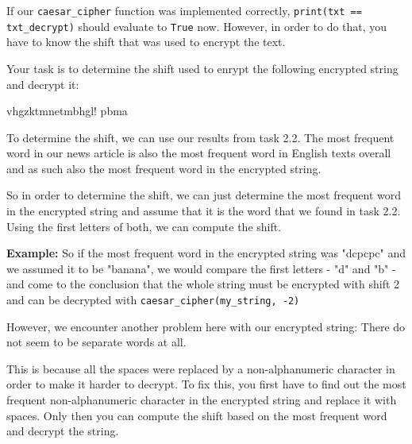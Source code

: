 \vspace{1em}

\noindent If our \texttt{caesar\_cipher} function was implemented correctly, \texttt{print(txt == txt\_decrypt)} should evaluate to \texttt{True} now. However, in order to do that, you have to know the shift that was used to encrypt the text. 

\vspace{1em}

\noindent Your task is to determine the shift used to enrypt the following encrypted string and decrypt it:

\begin{outputcode}

vhgzktmnetmbhgl!%
pbma%

\end{outputcode}

\noindent To determine the shift, we can use our results from task 2.2. The most frequent word in our news article is also the most frequent word in English texts overall and as such also the most frequent word in the encrypted string.

\vspace{1em}

\noindent So in order to determine the shift, we can just determine the most frequent word in the encrypted string and assume that it is the word that we found in task 2.2. Using the first letters of both, we can compute the shift.

\vspace{1em}

\noindent \textbf{Example:} So if the most frequent word in the encrypted string was "dcpcpc" and we assumed it to be "banana", we would compare the first letters - "d" and "b" - and come to the conclusion that the whole string must be encrypted with shift 2 and can be decrypted with \texttt{caesar\_cipher(my\_string, -2)}

\vspace{1em}

\noindent However, we encounter another problem here with our encrypted string: There do not seem to be separate words at all.

\vspace{1em}

\noindent This is because all the spaces were replaced by a non-alphanumeric character in order to make it harder to decrypt. To fix this, you first have to find out the most frequent non-alphanumeric character in the encrypted string and replace it with spaces. Only then you can compute the shift based on the most frequent word and decrypt the string.

